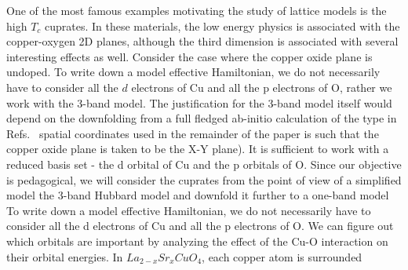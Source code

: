\documentclass[prl,12pt,onecolumn,nofootinbib,notitlepage,english,superscriptaddress]{revtex4-1}
\begin{document}
One of the most famous examples motivating the study of lattice models 
is the high $T_c$ cuprates. In these materials, the low energy physics is associated with the 
copper-oxygen 2D planes, although the third dimension is associated with several interesting effects as well. 
Consider the case where the copper oxide plane is undoped. To 
write down a model effective Hamiltonian, we do not necessarily
have to consider all the $d$ electrons of Cu and all the p
electrons of O, rather we work with the 3-band model. The justification for the 3-band model itself would depend 
on the downfolding from a full fledged ab-initio calculation of the type in Refs.~\cite{Wagner_Abbamonte, }
spatial coordinates used in the remainder of the paper is such
that the copper oxide plane is taken to be the X-Y plane). It
is sufficient to work with a reduced basis set - the d orbital of
Cu and the p orbitals of O.
Since our objective is pedagogical, we will consider the cuprates from the point of view of a simplified 
model the 3-band Hubbard model and downfold it further to a one-band model 
To
write down a model effective Hamiltonian, we do not necessarily
have to consider all the d electrons of Cu and all the p
electrons of O. We can figure out which orbitals are important
by analyzing the effect of the Cu-O interaction on their
orbital energies. In $La_{2-x}Sr_{x}CuO_4$, each copper atom is surrounded
\end{document}

